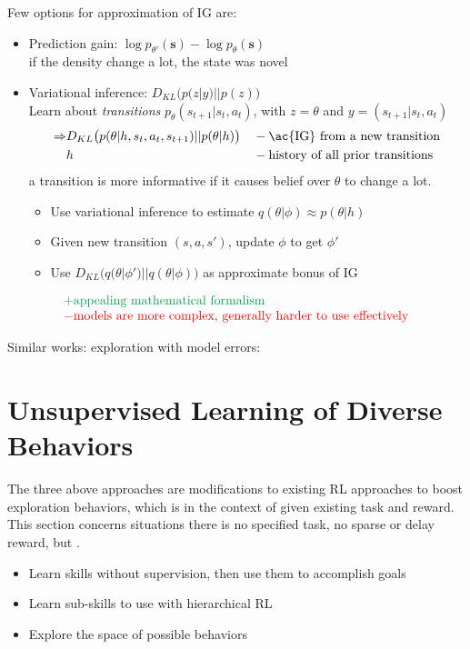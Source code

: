 Few options for approximation of \ac{IG} are:
\begin{itemize}
	\item Prediction gain: $\log p_{\theta'}(\textbf{s}) - \log p_{\theta}(\textbf{s})$ \cite{bellemare2016unifying}\\
	 if the density change a lot, the state was novel
	\item Variational inference: $D_{KL} \big( p(z|y) || p(z) \big)$\\
	Learn about \textit{transitions} $p_\theta (s_{t+1}|s_t, a_t)$, with $z=\theta$ and $y=(s_{t+1}|s_t, a_t)$
	\begin{align}
		\Rightarrow&D_{KL} \big( p(\theta|h, s_t, a_t, s_{t+1}) || p(\theta|h) \big) && -\text{\ac{IG} from a new transition}\\
		&h && -\text{history of all prior transitions}
	\end{align}
	 a transition is more informative if it causes belief over $\theta$ to change a lot.\\
	 \cite{houthooft2016vime}
	\begin{itemize}
		\item Use variational inference to estimate $q(\theta|\phi) \approx p(\theta|h)$
		\item Given new transition $(s,a,s')$, update $\phi$ to get $\phi'$
		\item Use $D_{KL} \big( q(\theta|\phi') || q(\theta|\phi)\big)$ as approximate bonus of \ac{IG}
	\end{itemize}
\end{itemize}
\[\begin{matrix*}[l]
	\color{Green}+ \text{appealing mathematical formalism}\\
	\color{red}- \text{models are more complex, generally harder to use effectively}
\end{matrix*}\]

Similar works: exploration with model errors: \cite{schmidhuber2010formal, stadie2015incentivizing}

\section{Unsupervised Learning of Diverse Behaviors}
The three above approaches are modifications to existing \ac{RL} approaches to boost exploration behaviors, which is in the context of given existing task and reward. This section concerns situations there is no specified task, no sparse or delay reward, but .
\begin{itemize}
	\item Learn skills without supervision, then use them to accomplish goals
	\item Learn sub-skills to use with hierarchical \ac{RL}
	\item Explore the space of possible behaviors
\end{itemize}

